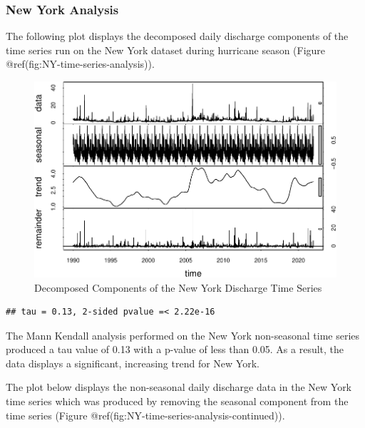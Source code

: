 \documentclass[
  12pt,
]{article}
\begin{document}
\hypertarget{new-york-analysis}{%
\subsubsection{New York Analysis}\label{new-york-analysis}}

The following plot displays the decomposed daily discharge components of
the time series run on the New York dataset during hurricane season
(Figure @ref(fig:NY-time-series-analysis)).

\begin{figure}

{\centering \includegraphics{BoosBrantleyHusted_ENV872_Project_files/figure-latex/NY-time-series-analysis-1} 

}

\caption{Decomposed Components of the New York Discharge Time Series}\label{fig:NY-time-series-analysis}
\end{figure}

\begin{verbatim}
## tau = 0.13, 2-sided pvalue =< 2.22e-16
\end{verbatim}

The Mann Kendall analysis performed on the New York non-seasonal time
series produced a tau value of 0.13 with a p-value of less than 0.05. As
a result, the data displays a significant, increasing trend for New
York.

The plot below displays the non-seasonal daily discharge data in the New
York time series which was produced by removing the seasonal component
from the time series (Figure
@ref(fig:NY-time-series-analysis-continued)).
\end{document}
